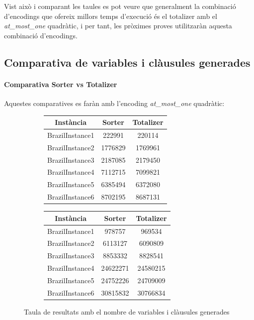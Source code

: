 \documentclass[11pt,a4paper,twoside]{report}
\begin{document}
  Vist això i comparant les taules es pot veure que generalment la combinació d'encodings que ofereix millors temps d'execució és el totalizer amb el \textit{at\_most\_one} quadràtic, i per tant, les pròximes proves utilitzaràn aquesta combinació d'encodings.

  \subsection{Comparativa de variables i clàusules generades}

  \paragraph*{Comparativa Sorter vs Totalizer}

  Aquestes comparatives es faràn amb l'encoding \textit{at\_most\_one} quadràtic:

  \begin{figure}[ht!]
    \centering
    \begin{subfigure}[b]{0.45\linewidth}
      \begin{tabular} { c | c c }
        Instància & Sorter & Totalizer \\
        \hline
        BrazilInstance1 & 222991 &  220114 \\
        BrazilInstance2 & 1776829 & 1769961  \\
        BrazilInstance3 & 2187085 & 2179450 \\
        BrazilInstance4 & 7112715 & 7099821 \\
        BrazilInstance5 & 6385494 & 6372080 \\
        BrazilInstance6 & 8702195 & 8687131 \\
      \end{tabular}
    \end{subfigure}
    \begin{subfigure}[b]{0.45\linewidth}
      \begin{tabular} { c | c c }
        Instància & Sorter & Totalizer \\
        \hline
        BrazilInstance1 & 978757 &    969534 \\
        BrazilInstance2 &  6113127 & 	6090809\\
        BrazilInstance3 &  8853332	& 8828541 \\
        BrazilInstance4 & 24622271	& 24580215 \\
        BrazilInstance5 & 24752226	& 24709009 \\
        BrazilInstance6 & 30815832	& 30766834 \\
      \end{tabular}
    \end{subfigure}
    \caption{Taula de resultats amb el nombre de variables i clàusules generades}
    \label{fig:taula5}
  \end{figure}
\end{document}
